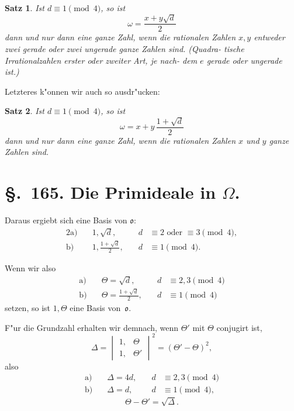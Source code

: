 \documentclass[12pt,a4paper]{article}
\theoremstyle{weber}
\newtheorem*{satz}{Satz}
\begin{document}
\begin{satz}
Ist $d \equiv 1 \pmod{4}$, so ist
\[
\omega = \frac{x + y\sqrt{d}}{2}
\]
dann und nur dann eine ganze Zahl, wenn die
rationalen Zahlen $x, y$ entweder zwei gerade
oder zwei ungerade ganze Zahlen sind. (Quadra-
tische Irrationalzahlen erster oder zweiter Art, je nach-
dem $e$ gerade oder ungerade ist.)
\end{satz}

Letzteres k"onnen wir auch so ausdr"ucken:

\begin{satz}
Ist $d \equiv 1 \pmod{4}$, so ist
\[
\omega = x + y\,\frac{1+\sqrt{d}}{2}
\]
dann und nur dann eine ganze Zahl, wenn die
rationalen Zahlen $x$ und $y$ ganze Zahlen sind.
\end{satz}

\newpage
\section*{\S.~165. Die Primideale in $\varOmega$.}

Daraus ergiebt sich eine Basis von $\mathfrak{o}$:
\begin{alignat*}{2}
\text{a)}\quad & 1, \sqrt{d}, &\quad d &\equiv 2 \text{ oder } \equiv 3 \pmod{4}, \\
\text{b)}\quad & 1, \frac{1+\sqrt{d}}{2}, &\quad d &\equiv 1 \pmod{4}.
\end{alignat*}

Wenn wir also
\begin{equation}\label{eq:s164-6}
\begin{alignedat}{2}
\text{a)}\quad & \varTheta = \sqrt{d}, &\quad d &\equiv 2, 3 \pmod{4} \\
\text{b)}\quad & \varTheta = \frac{1+\sqrt{d}}{2}, &\quad d &\equiv 1 \pmod{4}
\end{alignedat}
\end{equation}
setzen, so ist $1, \varTheta$ eine Basis von~$\mathfrak{o}$.

F"ur die Grundzahl erhalten wir demnach, wenn $\varTheta'$ mit $\varTheta$
conjugirt ist,
\[
\varDelta = \begin{vmatrix} 1, & \varTheta \\ 1, & \varTheta' \end{vmatrix}^2 = (\varTheta' - \varTheta)^2,
\]
also
\begin{equation}\label{eq:s164-7}
\begin{alignedat}{2}
\text{a)}\quad & \varDelta = 4d, &\quad d &\equiv 2, 3 \pmod{4} \\
\text{b)}\quad & \varDelta = d, &\quad d &\equiv 1 \pmod{4},
\end{alignedat}
\end{equation}
\begin{equation}\label{eq:s164-8}
\varTheta - \varTheta' = \sqrt{\varDelta}.
\end{equation}
\end{document}
